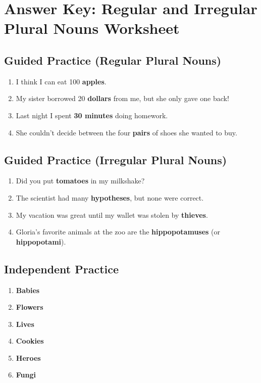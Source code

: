 \documentclass[12pt]{article}
\begin{document}
\section*{Answer Key: Regular and Irregular Plural Nouns Worksheet}

\subsection*{Guided Practice (Regular Plural Nouns)}
\begin{enumerate}
    \item I think I can eat 100 \textbf{apples}.
    \item My sister borrowed 20 \textbf{dollars} from me, but she only gave one back!
    \item Last night I spent \textbf{30 minutes} doing homework.
    \item She couldn't decide between the four \textbf{pairs} of shoes she wanted to buy.
\end{enumerate}

\subsection*{Guided Practice (Irregular Plural Nouns)}
\begin{enumerate}
    \item Did you put \textbf{tomatoes} in my milkshake?
    \item The scientist had many \textbf{hypotheses}, but none were correct.
    \item My vacation was great until my wallet was stolen by \textbf{thieves}.
    \item Gloria's favorite animals at the zoo are the \textbf{hippopotamuses} (or \textbf{hippopotami}).
\end{enumerate}

\subsection*{Independent Practice}
\begin{enumerate}
    \item \textbf{Babies}
    \item \textbf{Flowers}
    \item \textbf{Lives}
    \item \textbf{Cookies}
    \item \textbf{Heroes}
    \item \textbf{Fungi}
\end{enumerate}
\end{document}
